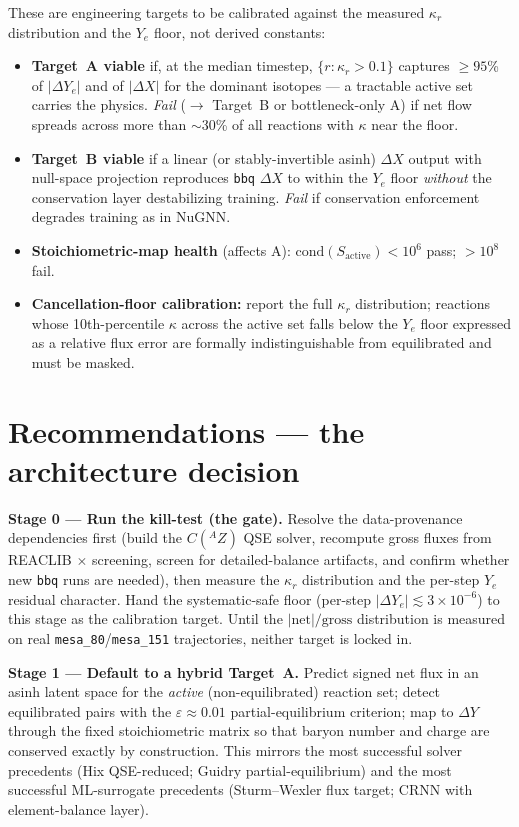 \documentclass[11pt]{article}
\begin{document}
These are engineering targets to be calibrated against the measured $\kappa_r$ distribution and the $Y_e$ floor, not derived constants:
\begin{itemize}
\item \textbf{Target~A viable} if, at the median timestep, $\{r : \kappa_r > 0.1\}$ captures $\ge 95$\% of $|\Delta Y_e|$ and of $|\Delta X|$ for the dominant isotopes --- a tractable active set carries the physics. \emph{Fail} ($\to$ Target~B or bottleneck-only A) if net flow spreads across more than $\sim$30\% of all reactions with $\kappa$ near the floor.
\item \textbf{Target~B viable} if a linear (or stably-invertible asinh) $\Delta X$ output with null-space projection reproduces \texttt{bbq} $\Delta X$ to within the $Y_e$ floor \emph{without} the conservation layer destabilizing training. \emph{Fail} if conservation enforcement degrades training as in NuGNN.
\item \textbf{Stoichiometric-map health} (affects A): $\mathrm{cond}(S_{\text{active}}) < 10^6$ pass; $> 10^8$ fail.
\item \textbf{Cancellation-floor calibration:} report the full $\kappa_r$ distribution; reactions whose 10th-percentile $\kappa$ across the active set falls below the $Y_e$ floor expressed as a relative flux error are formally indistinguishable from equilibrated and must be masked.
\end{itemize}

\section{Recommendations --- the architecture decision}

\noindent\textbf{Stage 0 --- Run the kill-test (the gate).} Resolve the data-provenance dependencies first (build the $C({}^{A}Z)$ QSE solver, recompute gross fluxes from REACLIB $\times$ screening, screen for detailed-balance artifacts, and confirm whether new \texttt{bbq} runs are needed), then measure the $\kappa_r$ distribution and the per-step $Y_e$ residual character. Hand the systematic-safe floor (per-step $|\Delta Y_e| \lesssim 3\times10^{-6}$) to this stage as the calibration target. Until the $|\text{net}|/\text{gross}$ distribution is measured on real \texttt{mesa\_80}/\texttt{mesa\_151} trajectories, neither target is locked in.

\smallskip
\noindent\textbf{Stage 1 --- Default to a hybrid Target~A.} Predict signed net flux in an asinh latent space for the \emph{active} (non-equilibrated) reaction set; detect equilibrated pairs with the $\varepsilon \approx 0.01$ partial-equilibrium criterion; map to $\Delta Y$ through the fixed stoichiometric matrix so that baryon number and charge are conserved exactly by construction. This mirrors the most successful solver precedents (Hix QSE-reduced; Guidry partial-equilibrium) and the most successful ML-surrogate precedents (Sturm--Wexler flux target; CRNN with element-balance layer).
\end{document}

